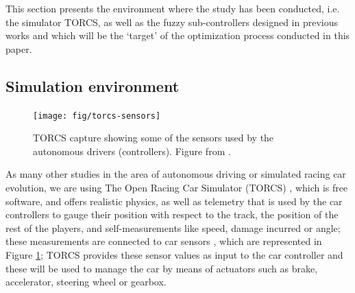 \documentclass[10pt,journal,compsoc]{IEEEtran}
\begin{document}
This section presents the environment where the study has been conducted, i.e. the simulator TORCS, as well as the fuzzy sub-controllers designed in previous works and which will be the `target' of the optimization process conducted in this paper. 

%

\subsection{Simulation environment}

\begin{figure}[!ht] 
	\begin{center}
		\texttt{[image: fig/torcs-sensors]}
		\caption {TORCS capture showing some of the sensors
                used by the autonomous drivers (controllers). Figure from \cite{DBLP:conf/cig/SalemMG19}.}
		\label{fig:torcs-sensors}
	\end{center}
\end{figure}

As many other studies in the area of autonomous driving or simulated
racing car evolution, we are using The Open Racing Car Simulator
(TORCS) \cite{torcs4}, which is free software, and offers realistic
physics, as well as telemetry that is used by the car controllers to
gauge their position with respect to the track, the position of the
rest of the players, and self-measurements like speed, damage incurred
or angle; these measurements are connected to car sensors \cite{torcs5}, which are represented in Figure \ref{fig:torcs-sensors}; TORCS provides
these sensor values as input to the car controller and these will be
used to manage the car by means of actuators such as brake,
accelerator, steering wheel or gearbox. 

\end{document}
